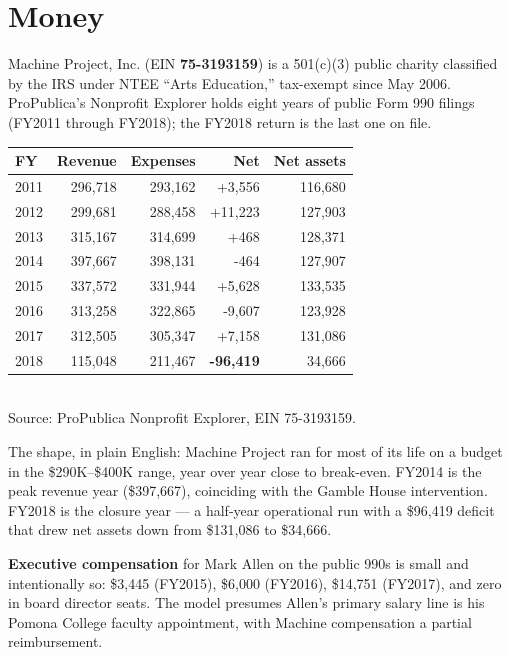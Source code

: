\documentclass[10pt,letterpaper,twocolumn]{article}
\begin{document}
\section{Money}\label{sec:money}

Machine Project, Inc. (EIN \textbf{75-3193159}) is a 501(c)(3) public charity classified by the IRS under NTEE ``Arts Education,'' tax-exempt since May 2006. ProPublica's Nonprofit Explorer holds eight years of public Form 990 filings (FY2011 through FY2018); the FY2018 return is the last one on file.~\citep{propublicamachine,charitynavmachine}

\begin{table}[h]
\footnotesize
\centering
\setlength{\tabcolsep}{4pt}
\begin{tabularx}{\columnwidth}{Xrrrr}
\toprule
\textbf{FY} & \textbf{Revenue} & \textbf{Expenses} & \textbf{Net} & \textbf{Net assets} \\
\midrule
2011 & 296,718 & 293,162 & +3,556 & 116,680 \\
2012 & 299,681 & 288,458 & +11,223 & 127,903 \\
2013 & 315,167 & 314,699 & +468 & 128,371 \\
2014 & 397,667 & 398,131 & -464 & 127,907 \\
2015 & 337,572 & 331,944 & +5,628 & 133,535 \\
2016 & 313,258 & 322,865 & -9,607 & 123,928 \\
2017 & 312,505 & 305,347 & +7,158 & 131,086 \\
2018 & 115,048 & 211,467 & \textbf{-96,419} & 34,666 \\
\bottomrule
\end{tabularx}
\\[0.3em]
\footnotesize Source: ProPublica Nonprofit Explorer, EIN 75-3193159.
\end{table}

The shape, in plain English: Machine Project ran for most of its life on a budget in the \$290K--\$400K range, year over year close to break-even. FY2014 is the peak revenue year (\$397,667), coinciding with the Gamble House intervention. FY2018 is the closure year --- a half-year operational run with a \$96,419 deficit that drew net assets down from \$131,086 to \$34,666.

\textbf{Executive compensation} for Mark Allen on the public 990s is small and intentionally so: \$3,445 (FY2015), \$6,000 (FY2016), \$14,751 (FY2017), and zero in board director seats. The model presumes Allen's primary salary line is his Pomona College faculty appointment, with Machine compensation a partial reimbursement.
\end{document}
